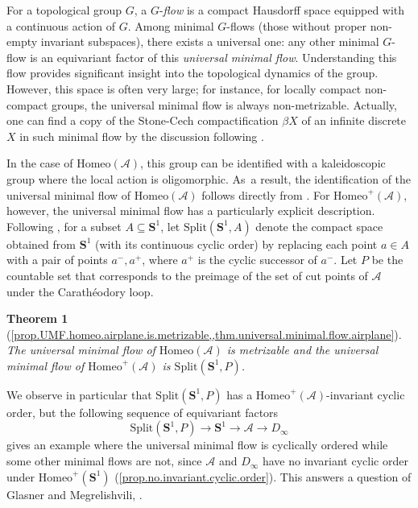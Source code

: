 \documentclass[JEP,XML,SOM,Unicode,NoFloatCountersInSection,published]{cedram}
\theoremstyle{plain}
\newtheorem{introtheorem}{Theorem}
\theoremstyle{definition}
\theoremstyle{remark}
\newcommand{\Homeo}{\mathrm{Homeo}}
\newcommand{\Split}{\mathrm{Split}}
\newcommand{\A}{\mathcal{A}}
\begin{document}
For a topological group $G$, a $G$-\emph{flow} is a compact Hausdorff space equipped with a continuous action of $G$.
Among minimal $G$-flows (those without proper non-empty invariant subspaces), there exists a universal one: any other minimal $G$-flow is an equivariant factor of this \emph{universal minimal flow}.
Understanding this flow provides significant insight into the topological dynamics of the group.
However, this space is often very large; for instance, for locally compact non-compact groups, the universal minimal flow is always non-metrizable.
Actually, one can find a copy of the Stone-Cech compactification $\beta X$ of an infinite discrete $X$ in such minimal flow by the discussion following \cite[Th.\,3.1.1]{Pestov_99}.

In the case of \(\Homeo(\A)\), this group can be identified with a kaleidoscopic group where the local action is oligomorphic. As~a result, the identification of the universal minimal flow of \(\Homeo(\A)\) follows directly from \cite[Th.\,1.1]{Kaleidoscopic2}.
For \(\Homeo^+(\A)\), however, the universal minimal flow has a particularly explicit description.
Following \cite{Glasner-Megrelishvili-2018}, for a subset \(A \subseteq \mathbf{S}^1\), let \(\Split(\mathbf{S}^1, A)\) denote the compact space obtained from \(\mathbf{S}^1\) (with its continuous cyclic order) by replacing each point \(a \in A\) with a pair of points \(a^-, a^+\), where \(a^+\) is the cyclic successor of \(a^-\).
Let \(P\) be the countable set that corresponds to the preimage of the set of cut points of \(\A\) under the Carathéodory loop.

\begin{introtheorem}[\cref{prop.UMF.homeo.airplane.is.metrizable,,thm.universal.minimal.flow.airplane}]
\label{thm.universal.minimal.flows}
The universal minimal flow of $\Homeo(\A)$ is metrizable and the universal minimal flow of $\Homeo^+(\A)$ is $\Split(\mathbf{S}^1,P)$.
\end{introtheorem}

We observe in particular that $\Split(\mathbf{S}^1,P)$ has a $\Homeo^+(\A)$-invariant cyclic order, but the following sequence of equivariant factors
\[
 \Split(\mathbf{S}^1,P)\to\mathbf{S}^1\to\A\to D_\infty 
\]
gives an example where the universal minimal flow is cyclically ordered while some other minimal flows are not, since $\A$ and $D_\infty$ have no invariant cyclic order under $\Homeo^+(\mathbf{S}^1)$ (\cref{prop.no.invariant.cyclic.order}).
This answers a question of Glasner and Megrelishvili, \cite[Quest.\,4.9]{Glasner-Megrelishvili-2018}.
\end{document}
